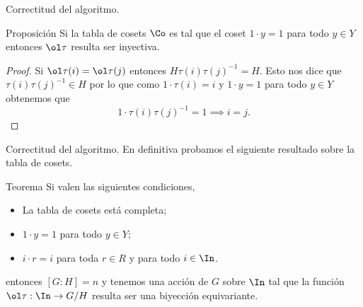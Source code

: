 \documentclass[aspectratio=169, 9pt]{beamer}
\begin{document}
\begin{frame}[fragile]{Correctitud del algoritmo.}
	\begin{alertblock}{Proposición}
		Si la tabla de cosets $\Co$ es tal que el coset $1 \cdot y = 1$ para todo $y \in Y$ entonces $\ol \tau$ resulta ser inyectiva.
	\end{alertblock}
	\pause
	\begin{proof}
		Si $\ol \tau (i) = \ol \tau (j)$ entonces $H \tau (i) \tau (j)^{-1} = H$.
		\pause
		Esto nos dice que $\tau (i) \tau(j)^{-1} \in H$ por lo que como $ 1 \cdot {\tau(i)} = i$ y  $1 \cdot y = 1$ para todo $y \in Y$ obtenemos que 
		\[
		1 \cdot \tau(i)\tau(j)^{-1} = 1 \implies i = j.
		\]   
	\end{proof}
\end{frame}



\begin{frame}[fragile]{Correctitud del algoritmo.}
	En definitiva probamos el siguiente resultado sobre la tabla de cosets.
	\pause
	\begin{alertblock}{Teorema}
		Si valen las siguientes condiciones,
		\begin{itemize}
			\item La tabla de cosets está completa;
			\item $1\cdot y = 1$ para todo $y \in Y$;
			\item $i \cdot r  = i$ para toda $r \in R$ y para todo $i \in \In$.
		\end{itemize}
		\pause
		entonces $[G:H] = n$ y tenemos una acción de $G$ sobre $\In$ tal que la función $\ol \tau: \In \to G/H$ resulta ser una biyección equivariante.
	\end{alertblock}
	\medskip
\end{frame}
\end{document}
